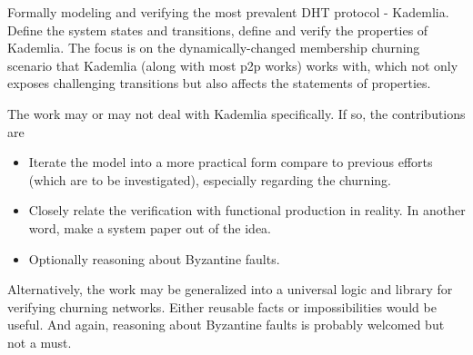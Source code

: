 Formally modeling and verifying the most prevalent DHT protocol - Kademlia.
Define the system states and transitions, define and verify the properties of Kademlia.
The focus is on the dynamically-changed membership \ie churning scenario that Kademlia (along with most p2p works) works with, which not only exposes challenging transitions but also affects the statements of properties.

The work may or may not deal with Kademlia specifically.
If so, the contributions are
\begin{itemize}
    \item Iterate the model into a more practical form compare to previous efforts (which are to be investigated), especially regarding the churning.
    \item Closely relate the verification with functional production in reality.
    In another word, make a system paper out of the idea.
    \item Optionally reasoning about Byzantine faults.
\end{itemize}

Alternatively, the work may be generalized into a universal logic and library for verifying churning networks.
Either reusable facts or impossibilities would be useful.
And again, reasoning about Byzantine faults is probably welcomed but not a must.